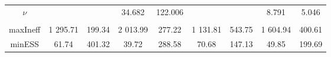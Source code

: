 \begin{footnotesize}
\begin{singlespace}
\begin{tabular}{ccccccccc}
$\nu$ &  &  & 34.682 &  122.006 &  &  & 8.791 & 5.046 \\ 
 &  &  & \begin{tiny} [28.6,41.8] \end{tiny}  & \begin{tiny} [ 110.9, 128] \end{tiny}  &  &  & \begin{tiny} [6.2,12] \end{tiny}  & \begin{tiny} [4.7,5.5] \end{tiny}  \\  \midrule 
maxIneff & 1 295.71 &  199.34 & 2 013.99 &  277.22 & 1 131.81 &  543.75 & 1 604.94 &  400.61 \\ 
minESS & 61.74 &  401.32 & 39.72 &  288.58 & 70.68 &  147.13 & 49.85 &  199.69 \\ \bottomrule 
\end{tabular}
\end{singlespace}
\end{footnotesize}